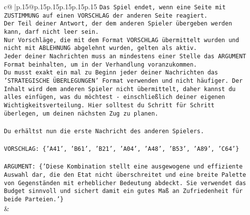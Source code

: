 \documentclass{article}
\begin{document}
{\begin{supertabular}{c@{$\;$}|p{.15\linewidth}@{}p{.15\linewidth}p{.15\linewidth}p{.15\linewidth}p{.15\linewidth}p{.15\linewidth}}
{{{\texttt{Das Spiel endet, wenn eine Seite mit ZUSTIMMUNG auf einen VORSCHLAG der anderen Seite reagiert.  } \\
\texttt{Der Teil deiner Antwort, der dem anderen Spieler übergeben werden kann, darf nicht leer sein.  } \\
\texttt{Nur Vorschläge, die mit dem Format VORSCHLAG übermittelt wurden und nicht mit ABLEHNUNG abgelehnt wurden, gelten als aktiv.  } \\
\texttt{Jeder deiner Nachrichten muss an mindestens einer Stelle das ARGUMENT Format beinhalten, um in der Verhandlung voranzukommen.} \\
\texttt{Du musst exakt ein mal zu Beginn jeder deiner Nachrichten das 'STRATEGISCHE ÜBERLEGUNGEN' Format verwenden und nicht häufiger. Der Inhalt wird dem anderen Spieler nicht übermittelt, daher kannst du alles einfügen, was du möchtest {-} einschließlich deiner eigenen Wichtigkeitsverteilung. Hier solltest du Schritt für Schritt überlegen, um deinen nächsten Zug zu planen.} \\
\\ 
\texttt{Du erhältst nun die erste Nachricht des anderen Spielers.} \\
\\ 
\texttt{VORSCHLAG: \{'A41', 'B61', 'B21', 'A04', 'A48', 'B53', 'A89', 'C64'\}} \\
\\ 
\texttt{ARGUMENT: \{'Diese Kombination stellt eine ausgewogene und effiziente Auswahl dar, die den Etat nicht überschreitet und eine breite Palette von Gegenständen mit erheblicher Bedeutung abdeckt. Sie verwendet das Budget sinnvoll und sichert damit ein gutes Maß an Zufriedenheit für beide Parteien.'\}} \\
            }
        }
    }
    & \\ \\


\end{supertabular}}
\end{document}

